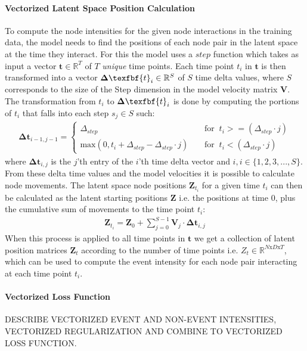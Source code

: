 \paragraph{Vectorized Latent Space Position Calculation}
\label{sec:Method:LatentSpacePositionCalculation}
To compute the node intensities for the given node interactions in the training data, the model needs to find the positions of each node pair in the latent space at the time they interact. For this the model uses a $step$ function which takes as input a vector $\textbf{t} \in \mathbb{R}^{T}$ of $T$ \textit{unique} time points. Each time point $t_i$ in $\textbf{t}$ is then transformed into a vector $\boldsymbol{\Delta} \texfbf{t}_{i} \in \mathbb{R}^S$ of $S$ time delta values, where $S$ corresponds to the size of the Step dimension in the model velocity matrix $\textbf{V}$. The transformation from $t_i$ to $\boldsymbol{\Delta} \texfbf{t}_{i}$ is done by computing the portions of $t_i$ that falls into each step $s_j \in S$ such:
\begin{align}
    \boldsymbol{\Delta} \textbf{t}_{i-1,j-1} = 
    \begin{cases}
        \Delta_{step} \;\; &\text{for} \;\; t_i >= (\Delta_{step} \cdot j) \\
        \text{max}(0, t_i + \Delta_{step} - \Delta_{step} \cdot j) \;\; \;\; &\text{for} \;\; t_i < (\Delta_{step} \cdot j)
    \end{cases}
\end{align}
where $\boldsymbol{\Delta} \textbf{t}_{i,j}$ is the $j$'th entry of the $i$'th time delta vector and $i,i \in \{1,2,3,...,S\}$.
\\
From these delta time values and the model velocities it is possible to calculate node movements. The latent space node positions $\textbf{Z}_{t_i}$ for a given time $t_i$ can then be calculated as the latent starting positions $\textbf{Z}$ i.e. the positions at time 0, plus the cumulative sum of movements to the time point $t_i$:
\begin{align}
    \textbf{Z}_{t_i} = \textbf{Z}_{0} + \sum_{j=0}^{S-1}\textbf{V}_{j} \cdot \boldsymbol{\Delta} \textbf{t}_{i,j}
\end{align}
When this process is applied to all time points in $\textbf{t}$ we get a collection of latent position matrices $\textbf{Z}_t$ according to the number of time points i.e. $Z_t \in \mathbb{R}^{N\text{x}D\text{x}T}$, which can be used to compute the event intensity for each node pair interacting at each time point $t_i$.

\paragraph{Vectorized Loss Function}
DESCRIBE VECTORIZED EVENT AND NON-EVENT INTENSITIES, VECTORIZED REGULARIZATION AND COMBINE TO VECTORIZED LOSS FUNCTION.

